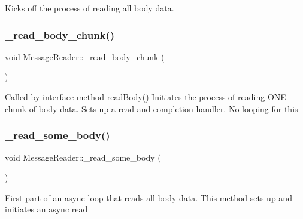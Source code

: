 Kicks off the process of reading all body data. \mbox{\label{class_message_reader_a10d3092b2b3200eaf9b69e49d36d1d69}} 
\subsubsection{\texorpdfstring{\+\_\+read\+\_\+body\+\_\+chunk()}{\_read\_body\_chunk()}}
{\footnotesize\ttfamily void Message\+Reader\+::\+\_\+read\+\_\+body\+\_\+chunk (\begin{DoxyParamCaption}{ }\end{DoxyParamCaption})\hspace{0.3cm}{\ttfamily [protected]}}

Called by interface method \hyperlink{class_message_reader_a811c0c6620e4bc7af99d5f519552846f}{read\+Body()} Initiates the process of reading O\+NE chunk of body data. Sets up a read and completion handler. No looping for this \mbox{\label{class_message_reader_acc54adf0f70b46dfcd73d017b1bb422c}} 
\subsubsection{\texorpdfstring{\+\_\+read\+\_\+some\+\_\+body()}{\_read\_some\_body()}}
{\footnotesize\ttfamily void Message\+Reader\+::\+\_\+read\+\_\+some\+\_\+body (\begin{DoxyParamCaption}{ }\end{DoxyParamCaption})\hspace{0.3cm}{\ttfamily [protected]}}

First part of an async loop that reads all body data. This method sets up and initiates an async read \mbox{\label{class_message_reader_a73def02a6454f8c90df358790d798718}} 
